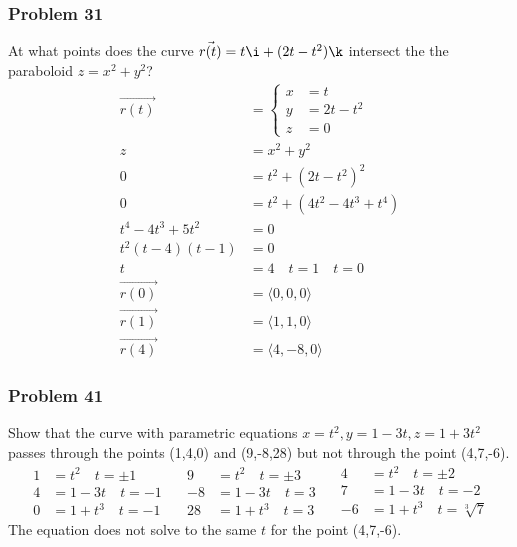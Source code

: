 \documentclass[letterpaper, 12pt]{math}
\begin{document}
\subsubsection*{Problem 31}
At what points does the curve \( \vec{r(t)} = t\i+(2t-t^2)\k \) intersect the
the paraboloid \( z = x^2+y^2 \)?
\begin{align*}
  \overrightarrow{r(t)} &= \begin{cases}
    x &= t \\
    y &= 2t-t^2 \\
    z &= 0
  \end{cases} \\
  z &= x^2+y^2 \\
  0 &= t^2+(2t-t^2)^2 \\
  0 &= t^2+(4t^2-4t^3+t^4) \\
  t^4-4t^3+5t^2 &= 0 \\
  t^2(t-4)(t-1) &= 0 \\
  t &= 4 \quad t = 1 \quad t = 0 \\
  \overrightarrow{r(0)} &= \langle0,0,0\rangle \\
  \overrightarrow{r(1)} &= \langle1,1,0\rangle \\
  \overrightarrow{r(4)} &= \langle4,-8,0\rangle
\end{align*}

\subsubsection*{Problem 41}
Show that the curve with parametric equations \( x = t^2, y = 1-3t, z = 1+3t^2
\) passes through the points (1,4,0) and (9,-8,28) but not through the point
(4,7,-6).
\[ \begin{split}
  1 &= t^2 \quad t = \pm1 \\
  4 &= 1-3t \quad t = -1 \\
  0 &= 1+t^3 \quad t = -1
\end{split}\quad\begin{split}
  9 &= t^2 \quad t = \pm3 \\
  -8 &= 1-3t \quad t = 3 \\
  28 &= 1+t^3 \quad t = 3
\end{split}\quad\begin{split}
  4 &= t^2 \quad t = \pm2 \\
  7 &= 1-3t \quad t = -2 \\
  -6 &= 1+t^3 \quad t = \sqrt[3]{7}
\end{split} \]
The equation does not solve to the same \( t \) for the point (4,7,-6).
\end{document}
